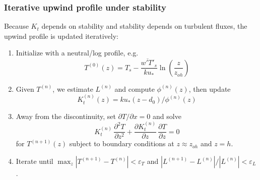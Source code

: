 \documentclass{article}
\begin{document}
    \subsubsection*{Iterative upwind profile under stability}

    Because $K_t$ depends on stability and stability depends on turbulent fluxes,  the
    upwind profile is updated iteratively:

    \begin{enumerate}
    \item Initialize with a neutral/log profile, e.g.\
    $$T^{(0)}(z)=T_s-\frac{\overline{w'T'}_s}{k u_*}\ln\!\left(\frac{z}{z_{oh}}\right)$$
    \item Given $T^{(n)}$, we estimate $L^{(n)}$ and compute $\phi^{(n)}(z)$, then update $$K_t^{(n)}(z)=k u_*(z-d_0)/\phi^{(n)}(z)$$
    \item Away from the discontinuity, set $\partial T/\partial x=0$ and solve
    \begin{equation}
    K_t^{(n)}\,\frac{\partial^2 T}{\partial z^2}
    +
    \frac{\partial K_t^{(n)}}{\partial z}\,\frac{\partial T}{\partial z}=0
    \end{equation}
    for $T^{(n+1)}(z)$ subject to boundary conditions at $z\approx z_{oh}$ and $z=h$.
    \item Iterate until $\max_z |T^{(n+1)}-T^{(n)}|<\varepsilon_T$ and $|L^{(n+1)}-L^{(n)}|/|L^{(n)}|<\varepsilon_L$.
    \end{enumerate}

    
    
    

    
\end{document}

